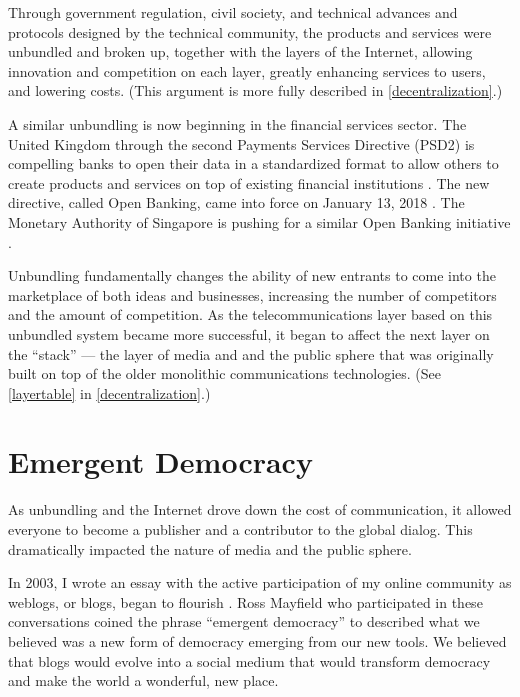 Through government regulation, civil society, and technical advances and protocols designed by the technical community, the products and services were unbundled and broken up, together with the layers of the Internet, allowing innovation and competition on each layer, greatly enhancing services to users, and lowering costs. (This argument is more fully described in \autoref{decentralization}.)

A similar unbundling is now beginning in the financial services sector. The United Kingdom through the second Payments Services Directive (PSD2) is compelling banks to open their data in a standardized format to allow others to create products and services on top of existing financial institutions \cite{cortet2016psd2}. The new directive, called Open Banking, came into force on January 13, 2018 \cite{manthorpe_what_nodate}. The Monetary Authority of Singapore is pushing for a similar Open Banking initiative \cite{banking_singapore_2017}.

Unbundling fundamentally changes the ability of new entrants to come into the marketplace of both ideas and businesses, increasing the number of competitors and the amount of competition. As the telecommunications layer based on this unbundled system became more successful, it began to affect the next layer on the ``stack'' --- the layer of media and and the public sphere that was originally built on top of the older monolithic communications technologies. (See \autoref{layertable} in \autoref{decentralization}.)

\section{Emergent Democracy}
\label{emergentdemo}

As unbundling and the Internet drove down the cost of communication, it allowed everyone to become a publisher and a contributor to the global dialog. This dramatically impacted the nature of media and the public sphere.

In 2003, I wrote an essay with the active participation of my online community as weblogs, or blogs, began to flourish \cite{1Emergen42:online}. Ross Mayfield who participated in these conversations coined the phrase ``emergent democracy'' to described what we believed was a new form of democracy emerging from our new tools. We believed that blogs would evolve into a social medium that would transform democracy and make the world a wonderful, new place. 

